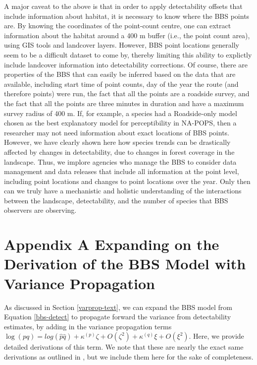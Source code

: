 \documentclass[12pt]{article}
\begin{document}
\par A major caveat to the above is that in order to apply detectability offsets that include information about habitat, it is necessary to know where the BBS points are.
By knowing the coordinates of the point-count centre, one can extract information about the habitat around a 400 m buffer (i.e., the point count area), using GIS tools and landcover layers. 
However, BBS point locations generally seem to be a difficult dataset to come by, thereby limiting this ability to explictly include landcover information into detectability corrections.
Of course, there are properties of the BBS that can easily be inferred based on the data that are available, including start time of point counts, day of the year the route (and therefore points) were run, the fact that all the points are a roadside survey, and the fact that all the points are three minutes in duration and have a maximum survey radius of 400 m.
If, for example, a species had a Roadside-only model chosen as the best explanatory model for perceptibility in NA-POPS, then a researcher may not need information about exact locations of BBS points.
However, we have clearly shown here how species trends can be drastically affected by changes in detectability, due to changes in forest coverage in the landscape.
Thus, we implore agencies who manage the BBS to consider data management and data releases that include all information at the point level, including point locations and changes to point locations over the year.
Only then can we truly have a mechanistic and holistic understanding of the interactions between the landscape, detectability, and the number of species that BBS observers are observing.



	

\section{Appendix A Expanding on the Derivation of the BBS Model with Variance Propagation}

\par As discussed in Section \ref{varprop-text}, we can expand the BBS model from Equation \ref{bbs-detect} to propagate forward the variance from detectability estimates, by adding in the variance propagation terms $	\log(pq) = log(\hat{p} \hat{q}) + \kappa^{(p)}\zeta + O(\zeta^2) + \kappa^{(q)}\xi + O(\xi^2)$.
Here, we provide detailed derivations of this term.
We note that these are nearly the exact same derivations as outlined in \citet{bravington_variance_2021}, but we include them here for the sake of completeness.
\end{document}
